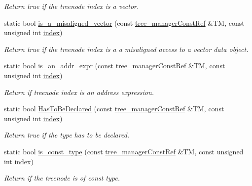 \begin{DoxyCompactItemize}
\begin{DoxyCompactList}\small\item\em Return true if the treenode index is a vector. \end{DoxyCompactList}\item 
static bool \hyperlink{classtree__helper_aa81c329e263e98a34db9f443eeac94ca}{is\+\_\+a\+\_\+misaligned\+\_\+vector} (const \hyperlink{tree__manager_8hpp_a792e3f1f892d7d997a8d8a4a12e39346}{tree\+\_\+manager\+Const\+Ref} \&TM, const unsigned int \hyperlink{tutorial__pact__2019_2Introduction_2third_2include_2Keccak_8h_a028c9bdc8344cca38ab522a337074797}{index})
\begin{DoxyCompactList}\small\item\em Return true if the treenode index is a a misaligned access to a vector data object. \end{DoxyCompactList}\item 
static bool \hyperlink{classtree__helper_a171004a12f78c6e98111be0d1c3b857a}{is\+\_\+an\+\_\+addr\+\_\+expr} (const \hyperlink{tree__manager_8hpp_a792e3f1f892d7d997a8d8a4a12e39346}{tree\+\_\+manager\+Const\+Ref} \&TM, const unsigned int \hyperlink{tutorial__pact__2019_2Introduction_2third_2include_2Keccak_8h_a028c9bdc8344cca38ab522a337074797}{index})
\begin{DoxyCompactList}\small\item\em Return if treenode index is an address expression. \end{DoxyCompactList}\item 
static bool \hyperlink{classtree__helper_af222b2ac92c27b68a6b18308f200d0c8}{Has\+To\+Be\+Declared} (const \hyperlink{tree__manager_8hpp_a792e3f1f892d7d997a8d8a4a12e39346}{tree\+\_\+manager\+Const\+Ref} \&TM, const unsigned int \hyperlink{tutorial__pact__2019_2Introduction_2third_2include_2Keccak_8h_a028c9bdc8344cca38ab522a337074797}{index})
\begin{DoxyCompactList}\small\item\em Return true if the type has to be declared. \end{DoxyCompactList}\item 
static bool \hyperlink{classtree__helper_a3553400cf2831632a96c6ceed46aa60b}{is\+\_\+const\+\_\+type} (const \hyperlink{tree__manager_8hpp_a792e3f1f892d7d997a8d8a4a12e39346}{tree\+\_\+manager\+Const\+Ref} \&TM, const unsigned int \hyperlink{tutorial__pact__2019_2Introduction_2third_2include_2Keccak_8h_a028c9bdc8344cca38ab522a337074797}{index})
\begin{DoxyCompactList}\small\item\em Return if the treenode is of const type. \end{DoxyCompactList}\item 

\end{DoxyCompactItemize}
